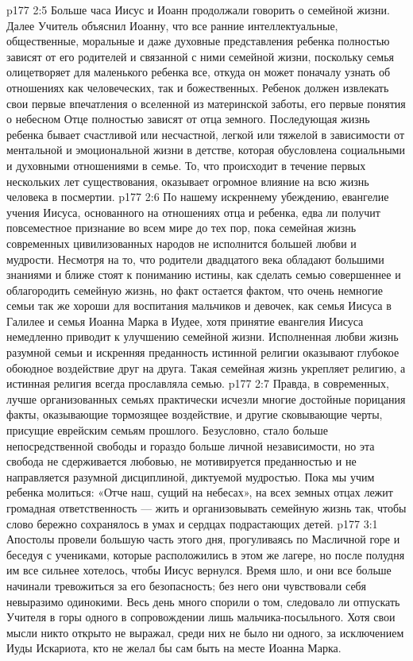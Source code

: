 \vs p177 2:5 Больше часа Иисус и Иоанн продолжали говорить о семейной жизни. Далее Учитель объяснил Иоанну, что все ранние интеллектуальные, общественные, моральные и даже духовные представления ребенка полностью зависят от его родителей и связанной с ними семейной жизни, поскольку семья олицетворяет для маленького ребенка все, откуда он может поначалу узнать об отношениях как человеческих, так и божественных. Ребенок должен извлекать свои первые впечатления о вселенной из материнской заботы, его первые понятия о небесном Отце полностью зависят от отца земного. Последующая жизнь ребенка бывает счастливой или несчастной, легкой или тяжелой в зависимости от ментальной и эмоциональной жизни в детстве, которая обусловлена социальными и духовными отношениями в семье. То, что происходит в течение первых нескольких лет существования, оказывает огромное влияние на всю жизнь человека в посмертии.
\vs p177 2:6 \pc По нашему искреннему убеждению, евангелие учения Иисуса, основанного на отношениях отца и ребенка, едва ли получит повсеместное признание во всем мире до тех пор, пока семейная жизнь современных цивилизованных народов не исполнится большей любви и мудрости. Несмотря на то, что родители двадцатого века обладают большими знаниями и ближе стоят к пониманию истины, как сделать семью совершеннее и облагородить семейную жизнь, но факт остается фактом, что очень немногие семьи так же хороши для воспитания мальчиков и девочек, как семья Иисуса в Галилее и семья Иоанна Марка в Иудее, хотя принятие евангелия Иисуса немедленно приводит к улучшению семейной жизни. Исполненная любви жизнь разумной семьи и искренняя преданность истинной религии оказывают глубокое обоюдное воздействие друг на друга. Такая семейная жизнь укрепляет религию, а истинная религия всегда прославляла семью.
\vs p177 2:7 Правда, в современных, лучше организованных семьях практически исчезли многие достойные порицания факты, оказывающие тормозящее воздействие, и другие сковывающие черты, присущие еврейским семьям прошлого. Безусловно, стало больше непосредственной свободы и гораздо больше личной независимости, но эта свобода не сдерживается любовью, не мотивируется преданностью и не направляется разумной дисциплиной, диктуемой мудростью. Пока мы учим ребенка молиться: «Отче наш, сущий на небесах», на всех земных отцах лежит громадная ответственность --- жить и организовывать семейную жизнь так, чтобы слово  бережно сохранялось в умах и сердцах подрастающих детей.
\vs p177 3:1 Апостолы провели большую часть этого дня, прогуливаясь по Масличной горе и беседуя с учениками, которые расположились в этом же лагере, но после полудня им все сильнее хотелось, чтобы Иисус вернулся. Время шло, и они все больше начинали тревожиться за его безопасность; без него они чувствовали себя невыразимо одинокими. Весь день много спорили о том, следовало ли отпускать Учителя в горы одного в сопровождении лишь мальчика\hyp{}посыльного. Хотя свои мысли никто открыто не выражал, среди них не было ни одного, за исключением Иуды Искариота, кто не желал бы сам быть на месте Иоанна Марка.
